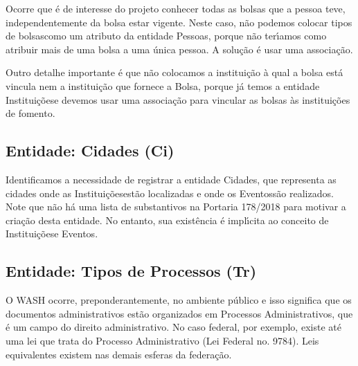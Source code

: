 \documentclass[
12pt,		%
openright,	%
twoside,  %
a4paper,			%
chapter=TITLE,		%
english,			%
french,				%
spanish,			%
brazil				%
]{USPSC-classe/USPSC}
\begin{document}
Ocorre que \'e de interesse do projeto conhecer todas as bolsas que a pessoa teve, independentemente da bolsa estar vigente. Neste caso, n\~ao podemos colocar \textquotedbl tipos de bolsas\textquotedbl  como um atributo da entidade \textquotedbl Pessoas\textquotedbl , porque n\~ao ter\'{\i}amos como atribuir mais de uma bolsa a uma \'unica pessoa. A solu\c{c}\~ao \'e usar uma associa\c{c}\~ao.










Outro detalhe importante \'e que n\~ao colocamos a institui\c{c}\~ao \`a qual a bolsa est\'a vincula nem a institui\c{c}\~ao que fornece a Bolsa, porque j\'a temos a entidade \textquotedbl Institui\c{c}\~oes\textquotedbl  e devemos usar uma associa\c{c}\~ao para vincular as bolsas \`as institui\c{c}\~oes de fomento.










\subsection[Entidade: Cidades (Ci)]{Entidade: Cidades (Ci)}\label{Entidade: Cidades (Ci)}
Identificamos a necessidade de registrar a entidade \textquotedbl Cidades\textquotedbl , que representa as cidades onde as \textquotedbl Institui\c{c}\~oes\textquotedbl  est\~ao localizadas e onde os \textquotedbl Eventos\textquotedbl  s\~ao realizados. Note que n\~ao h\'a uma lista de substantivos na Portaria 178/2018 para motivar a cria\c{c}\~ao desta entidade. No entanto, sua exist\^encia \'e impl\'{\i}cita ao conceito de \textquotedbl Institui\c{c}\~oes\textquotedbl  e \textquotedbl Eventos\textquotedbl .










\subsection[Entidade: Tipos de Processos (Tr)]{Entidade: Tipos de Processos (Tr)}\label{Entidade: Tipos de Processos (Tr)}
O WASH ocorre, preponderantemente, no ambiente p\'ublico e isso significa que os documentos administrativos est\~ao organizados em Processos Administrativos, que \'e um campo do direito administrativo. No caso federal, por exemplo, existe at\'e uma lei que trata do Processo Administrativo (Lei Federal no. 9784). Leis equivalentes existem nas demais esferas da federa\c{c}\~ao.
\end{document}
